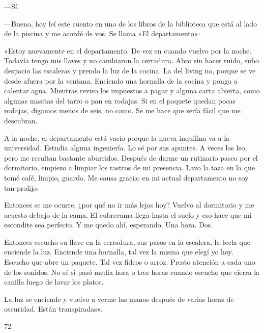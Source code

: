 \documentclass[12pt,twoside,openright,a5paper]{book}
\begin{document}
---Sí.

---Bueno, hoy leí este cuento en uno de los libros de la biblioteca que está
al lado de la piscina y me acordé de vos. Se llama «El departamento»:

«Estoy nuevamente en el departamento. De vez en cuando vuelvo por la
noche. Todavía tengo mis llaves y no cambiaron la cerradura. Abro sin hacer
ruido, subo despacio las escaleras y prendo la luz de la cocina. La del
living no, porque se ve desde afuera por la ventana. Enciendo una hornalla
de la cocina y pongo a calentar agua. Mientras reviso los
impuestos a pagar y alguna carta abierta, como algunas masitas del tarro
o pan en rodajas. Si en el paquete quedan pocas rodajas, digamos menos de
seis, no como. Se me hace que sería fácil que me descubran.

A la noche, el departamento está vacío porque la nueva inquilina va a la
universidad. Estudia alguna ingeniería. Lo sé por sus apuntes. A veces los
leo, pero me resultan bastante aburridos. Después de darme un rutinario
paseo por el dormitorio, empiezo a limpiar los rastros de mi presencia. Lavo
la taza en la que tomé café, limpio, guardo. Me causa gracia: en mi
actual departamento no soy tan prolijo.

Entonces se me ocurre, ¿por qué no ir más lejos hoy? Vuelvo al dormitorio
y me acuesto debajo de la cama. El cubrecama llega hasta el suelo y eso hace
que mi escondite sea perfecto. Y me quedo ahí, esperando. Una hora. Dos.

Entonces escucho su llave en la cerradura, sus pasos en la escalera, la tecla
que enciende la luz. Enciende una hornalla, tal vez la misma que elegí yo
hoy. Escucho que abre un paquete. Tal vez fideos o arroz. Presto atención
a cada uno de los sonidos. No sé si pasó media hora o tres horas cuando
escucho que cierra la canilla luego de lavar los platos.

La luz se enciende y vuelvo a verme las manos después de varias horas de
oscuridad. Están transpiradas».

\vspace{0.5cm}

\hrulefill \hspace{0.1cm}\decofourleft\hspace{0.2cm} 72 \hspace{0.2cm}\decofourright \hspace{0.1cm}\hrulefill

\nopagebreak

\vspace{0.5cm}
\end{document}
